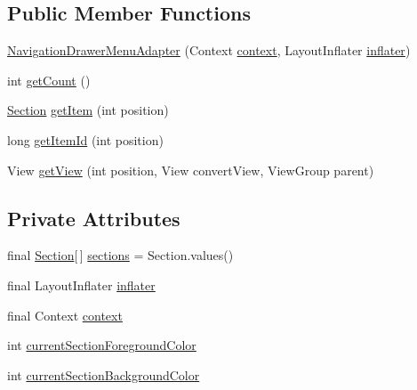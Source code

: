 \subsection*{Public Member Functions}
\begin{DoxyCompactItemize}
\item 
\hyperlink{classorg_1_1buildmlearn_1_1toolkit_1_1adapter_1_1NavigationDrawerMenuAdapter_a148e19ae5430bf4ca719570d18d7aba8}{Navigation\+Drawer\+Menu\+Adapter} (Context \hyperlink{classorg_1_1buildmlearn_1_1toolkit_1_1adapter_1_1NavigationDrawerMenuAdapter_ae48797ae44e71abb3a9909a228997325}{context}, Layout\+Inflater \hyperlink{classorg_1_1buildmlearn_1_1toolkit_1_1adapter_1_1NavigationDrawerMenuAdapter_a18058870aed341d30bb308c1b98abfe6}{inflater})
\item 
int \hyperlink{classorg_1_1buildmlearn_1_1toolkit_1_1adapter_1_1NavigationDrawerMenuAdapter_a05a59638b45d17d3852db05405de25c1}{get\+Count} ()
\item 
\hyperlink{enumorg_1_1buildmlearn_1_1toolkit_1_1model_1_1Section}{Section} \hyperlink{classorg_1_1buildmlearn_1_1toolkit_1_1adapter_1_1NavigationDrawerMenuAdapter_a5a1da2dcdb45463a2e24f39f4dc111b9}{get\+Item} (int position)
\item 
long \hyperlink{classorg_1_1buildmlearn_1_1toolkit_1_1adapter_1_1NavigationDrawerMenuAdapter_af4eeb5996c4511df23d9c08f35d2738a}{get\+Item\+Id} (int position)
\item 
View \hyperlink{classorg_1_1buildmlearn_1_1toolkit_1_1adapter_1_1NavigationDrawerMenuAdapter_afb2f8f5d68ab2fe433550cc122479be4}{get\+View} (int position, View convert\+View, View\+Group parent)
\end{DoxyCompactItemize}
\subsection*{Private Attributes}
\begin{DoxyCompactItemize}
\item 
final \hyperlink{enumorg_1_1buildmlearn_1_1toolkit_1_1model_1_1Section}{Section}\mbox{[}$\,$\mbox{]} \hyperlink{classorg_1_1buildmlearn_1_1toolkit_1_1adapter_1_1NavigationDrawerMenuAdapter_a0e9b490e10fe5905cf66797f76314603}{sections} = Section.\+values()
\item 
final Layout\+Inflater \hyperlink{classorg_1_1buildmlearn_1_1toolkit_1_1adapter_1_1NavigationDrawerMenuAdapter_a18058870aed341d30bb308c1b98abfe6}{inflater}
\item 
final Context \hyperlink{classorg_1_1buildmlearn_1_1toolkit_1_1adapter_1_1NavigationDrawerMenuAdapter_ae48797ae44e71abb3a9909a228997325}{context}
\item 
int \hyperlink{classorg_1_1buildmlearn_1_1toolkit_1_1adapter_1_1NavigationDrawerMenuAdapter_a930cdcd518fcdafd341e1ed6e114f01c}{current\+Section\+Foreground\+Color}
\item 
int \hyperlink{classorg_1_1buildmlearn_1_1toolkit_1_1adapter_1_1NavigationDrawerMenuAdapter_a576dc34ff9fb366870d371d5d049b12b}{current\+Section\+Background\+Color}
\end{DoxyCompactItemize}


